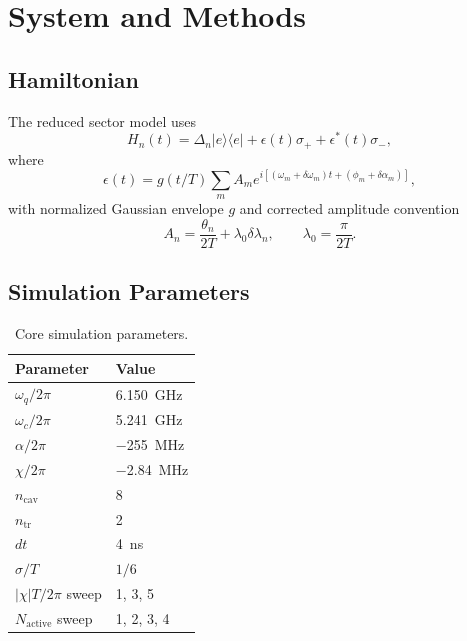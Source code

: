 \documentclass[aps,pra,twocolumn,reprint,amsmath,amssymb]{revtex4-2}
\begin{document}
\section{System and Methods}
\subsection{Hamiltonian}
The reduced sector model uses
\begin{equation}
H_n(t)=\Delta_n |e\rangle\langle e| + \epsilon(t)\sigma_+ + \epsilon^*(t)\sigma_-,
\end{equation}
where
\begin{equation}
\epsilon(t)=g(t/T)\sum_m A_m e^{i[(\omega_m+\delta\omega_m)t+(\phi_m+\delta\alpha_m)]},
\end{equation}
with normalized Gaussian envelope $g$ and corrected amplitude convention
\begin{equation}
A_n = \frac{\theta_n}{2T} + \lambda_0 \delta\lambda_n, \qquad \lambda_0 = \frac{\pi}{2T}.
\end{equation}

\subsection{Simulation Parameters}
\begin{table}[H]
\centering
\caption{Core simulation parameters.}
\begin{tabular}{ll}
\toprule
Parameter & Value \\
\midrule
$\omega_q/2\pi$ & \SI{6.150}{GHz} \\
$\omega_c/2\pi$ & \SI{5.241}{GHz} \\
$\alpha/2\pi$ & \SI{-255}{MHz} \\
$\chi/2\pi$ & \SI{-2.84}{MHz} \\
$n_{\mathrm{cav}}$ & 8 \\
$n_{\mathrm{tr}}$ & 2 \\
$dt$ & \SI{4}{ns} \\
$\sigma/T$ & $1/6$ \\
$|\chi|T/2\pi$ sweep & 1, 3, 5 \\
$N_{\mathrm{active}}$ sweep & 1, 2, 3, 4 \\
\bottomrule
\end{tabular}
\end{table}
\end{document}

